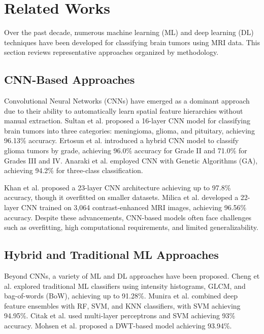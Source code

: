 \documentclass[a4paper,fleqn]{cas-sc}
\begin{document}
\section{Related Works}\label{sec2}

Over the past decade, numerous machine learning (ML) and deep learning (DL) techniques have been developed for classifying brain tumors using MRI data. This section reviews representative approaches organized by methodology.

\subsection{CNN-Based Approaches}

Convolutional Neural Networks (CNNs) have emerged as a dominant approach due to their ability to automatically learn spatial feature hierarchies without manual extraction. Sultan et al. \cite{R2} proposed a 16-layer CNN model for classifying brain tumors into three categories: meningioma, glioma, and pituitary, achieving 96.13\% accuracy. Ertosun et al. \cite{R23} introduced a hybrid CNN model to classify glioma tumors by grade, achieving 96.0\% accuracy for Grade II and 71.0\% for Grades III and IV. Anaraki et al. \cite{R24} employed CNN with Genetic Algorithms (GA), achieving 94.2\% for three-class classification.

Khan et al. \cite{R25} proposed a 23-layer CNN architecture achieving up to 97.8\% accuracy, though it overfitted on smaller datasets. Milica et al. \cite{R26} developed a 22-layer CNN trained on 3,064 contrast-enhanced MRI images, achieving 96.56\% accuracy. Despite these advancements, CNN-based models often face challenges such as overfitting, high computational requirements, and limited generalizability.

\subsection{Hybrid and Traditional ML Approaches}

Beyond CNNs, a variety of ML and DL approaches have been proposed. Cheng et al. \cite{R27} explored traditional ML classifiers using intensity histograms, GLCM, and bag-of-words (BoW), achieving up to 91.28\%. Munira et al. \cite{R28} combined deep feature ensembles with RF, SVM, and KNN classifiers, with SVM achieving 94.95\%. Citak et al. \cite{R29} used multi-layer perceptrons and SVM achieving 93\% accuracy. Mohsen et al. \cite{R30} proposed a DWT-based model achieving 93.94\%.
\end{document}
